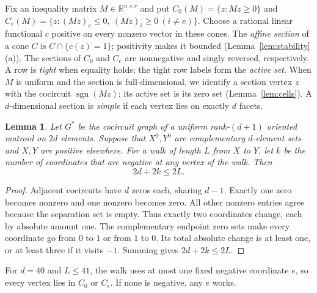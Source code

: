 \documentclass[11pt]{article}
\newtheorem{lemma}[theorem]{Lemma}
\theoremstyle{remark}
\newcommand{\R}{\mathbb R}
\newcommand{\sgn}{\operatorname{sgn}}
\begin{document}
Fix an inequality matrix $M\in\R^{n\times r}$ and put
$C_0(M)=\{z:Mz\ge0\}$ and
$C_e(M)=\{z:(Mz)_e\le0,\ (Mz)_i\ge0\ (i\ne e)\}$.
Choose a rational linear functional $c$ positive on every nonzero vector
in these cones. The \emph{affine section} of a cone $C$ is $C\cap\{c(z)=1\}$;
positivity makes it bounded (Lemma~\ref{lem:stability}(a)).
The sections of $C_0$ and $C_e$ are
nonnegative and singly reversed, respectively. A row is \emph{tight} when equality holds;
the tight row labels form the \emph{active set}.
When $M$ is uniform and the section is full-dimensional, we identify
a section vertex $z$ with the cocircuit $\sgn(Mz)$; its active set is
its zero set (Lemma~\ref{lem:cells}).
A $d$-dimensional section is
\emph{simple} if each vertex lies on exactly $d$ facets.

\begin{samepage}
\begin{lemma}\label{lem:count}
Let $G^*$ be the cocircuit graph of a uniform rank-$(d+1)$ oriented
matroid on $2d$ elements. Suppose that $X^0,Y^0$ are complementary
$d$-element sets and $X,Y$ are positive elsewhere. For a walk of length
$L$ from $X$ to $Y$, let $k$ be the number of coordinates that are
negative at any vertex of the walk. Then
\[
                      2d+2k\le2L.
\]
\end{lemma}
\end{samepage}
\begin{proof}
Adjacent cocircuits have $d$ zeros each, sharing $d-1$.
Exactly one zero becomes nonzero and one nonzero becomes zero.
All other nonzero entries agree because the separation set is empty.
Thus exactly two coordinates change, each by absolute amount one.
The complementary endpoint zero sets make every coordinate go from
$0$ to $1$ or from $1$ to $0$. Its total absolute change is at least one,
or at least three if it visits $-1$. Summing gives $2d+2k\le2L$.
\end{proof}

For $d=40$ and $L\le41$, the walk uses at most one fixed negative
coordinate $e$, so every vertex lies in $C_0$ or $C_e$.
If none is negative, any $e$ works.
\end{document}
